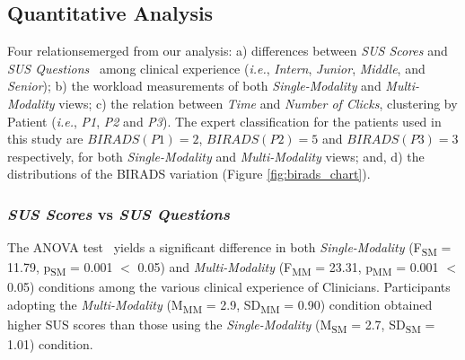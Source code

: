 \subsection{Quantitative Analysis}

Four relations\footnotemark[2] emerged from our analysis:
a) differences between \textit{SUS Scores} and \textit{SUS Questions}~\cite{Tyllinen:2016:WNN:2858036.2858570} among clinical experience ({\em i.e.}, \textit{Intern}, \textit{Junior}, \textit{Middle}, and \textit{Senior});
b) the workload measurements of both \textit{Single-Modality} and \textit{Multi-Modality} views;
c) the relation between \textit{Time} and \textit{Number of Clicks}, clustering by Patient ({\em i.e.}, \textit{P1}, \textit{P2} and \textit{P3}).
The expert classification for the patients used in this study are $BIRADS(P1) = 2$, $BIRADS(P2) = 5$ and $BIRADS(P3) = 3$ respectively, for both \textit{Single-Modality} and \textit{Multi-Modality} views; and, d) the distributions of the BIRADS variation (Figure \ref{fig:birads_chart}).


\subsubsection{\textit{SUS Scores} vs \textit{SUS Questions}}

The ANOVA test\footnotemark[3]~\cite{Wobbrock:2011:ART:1978942.1978963} yields a significant difference in both \textit{Single-Modality} (F\textsubscript{SM} = 11.79, p\textsubscript{SM} = 0.001 $<$ 0.05) and \textit{Multi-Modality} (F\textsubscript{MM} = 23.31, p\textsubscript{MM} = 0.001 $<$ 0.05) conditions among the various clinical experience of Clinicians.
Participants adopting the \textit{Multi-Modality} (M\textsubscript{MM} = 2.9, SD\textsubscript{MM} = 0.90) condition obtained higher SUS scores than those using the \textit{Single-Modality} (M\textsubscript{SM} = 2.7, SD\textsubscript{SM} = 1.01) condition.


